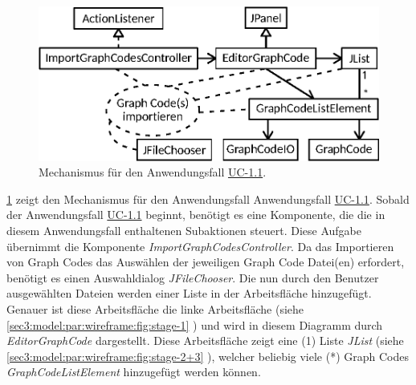 \begin{figure}[htb]
    \centering
    \includegraphics{chapter/chapter_3/mechanisms/mechanism-uc-1.1.eps}
    \caption{Mechanismus für den Anwendungsfall \hyperref[sec3:model:uc-1.1]{UC-1.1}.}
    \label{sec3:model:par:mechanism-use-cases:fig:mech-uc-1.1}
\end{figure}
\cref{sec3:model:par:mechanism-use-cases:fig:mech-uc-1.1} zeigt den Mechanismus für den Anwendungsfall Anwendungsfall \hyperref[sec3:model:uc-1.1]{UC-1.1}.
Sobald der Anwendungsfall \hyperref[sec3:model:uc-1.1]{UC-1.1} beginnt, benötigt es eine Komponente, die die in diesem Anwendungsfall enthaltenen Subaktionen steuert.
Diese Aufgabe übernimmt die Komponente \textit{ImportGraphCodesController}.
Da das Importieren von Graph Codes das Auswählen der jeweiligen Graph Code Datei(en) erfordert, benötigt es einen Auswahldialog \textit{JFileChooser}.
Die nun durch den Benutzer ausgewählten Dateien werden einer Liste in der Arbeitsfläche hinzugefügt.
Genauer ist diese Arbeitsfläche die linke Arbeitsfläche (siehe \cref{sec3:model:par:wireframe:fig:stage-1} ) und wird in diesem Diagramm durch \textit{EditorGraphCode} dargestellt.
Diese Arbeitsfläche zeigt eine (1) Liste \textit{JList} (siehe \cref{sec3:model:par:wireframe:fig:stage-2+3} ), welcher beliebig viele (*) Graph Codes \textit{GraphCodeListElement} hinzugefügt werden können.

